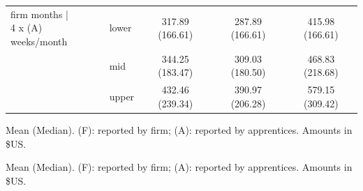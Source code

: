 \documentclass[
  11pt,
a4paper
]{article}
\begin{document}
\begin{table}[H]
\begin{threeparttable}
{\begin{tabular}[t]{llccc}
\makecell[l]{firm months |\\ 4 x (A) weeks/month} & lower & 317.89 (166.61) & 287.89 (166.61) & 415.98 (166.61)\\
 & mid & 344.25 (183.47) & 309.03 (180.50) & 468.83 (218.68)\\
 & upper & 432.46 (239.34) & 390.97 (206.28) & 579.15 (309.42)\\
\bottomrule
\end{tabular}}
\begin{tablenotes}
\small
\item Mean (Median). (F): reported by firm; (A): reported by apprentices. Amounts in \$US.
\end{tablenotes}
\end{threeparttable}
\end{table}

\begin{table}[H]

\caption{\label{tab:tbl-allowboundsapp}Allowances per apprentice per year, reported by apprentice}
\centering
\begin{threeparttable}
\begin{tablenotes}
\small
\item Mean (Median). (F): reported by firm; (A): reported by apprentices. Amounts in \$US.
\end{tablenotes}
\end{threeparttable}
\end{table}
\end{document}
